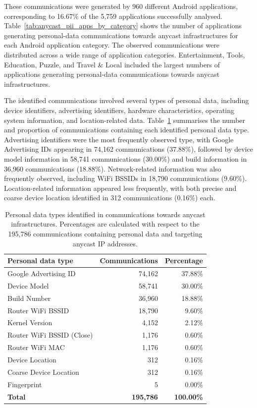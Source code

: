 These communications were generated by 960 different Android applications, corresponding to 16.67\% of the 5,759 applications successfully analysed. Table~\ref{tab:anycast_pii_apps_by_category} shows the number of applications generating personal-data communications towards anycast infrastructures for each Android application category. The observed communications were distributed across a wide range of application categories. Entertainment, Tools, Education, Puzzle, and Travel \& Local included the largest numbers of applications generating personal-data communications towards anycast infrastructures.

The identified communications involved several types of personal data, including device identifiers, advertising identifiers, hardware characteristics, operating system information, and location-related data. Table~\ref{tab:anycast_pii_communications_type} summarises the number and proportion of communications containing each identified personal data type. Advertising identifiers were the most frequently observed type, with Google Advertising IDs appearing in 74,162 communications (37.88\%), followed by device model information in 58,741 communications (30.00\%) and build information in 36,960 communications (18.88\%). Network-related information was also frequently observed, including WiFi BSSIDs in 18,790 communications (9.60\%). Location-related information appeared less frequently, with both precise and coarse device location identified in 312 communications (0.16\%) each.

\begin{table}[ht]
    \centering
    \small
    \caption{Personal data types identified in communications towards anycast infrastructures. Percentages are calculated with respect to the 195,786 communications containing personal data and targeting anycast IP addresses.}
    \label{tab:anycast_pii_communications_type}
    \begin{tabular}{lrr}
        \toprule
        \textbf{Personal data type} & \textbf{Communications} & \textbf{Percentage} \\
        \midrule
        Google Advertising ID & 74,162 & 37.88\% \\
        Device Model & 58,741 & 30.00\% \\
        Build Number & 36,960 & 18.88\% \\
        Router WiFi BSSID & 18,790 & 9.60\% \\
        Kernel Version & 4,152 & 2.12\% \\
        Router WiFi BSSID (Close) & 1,176 & 0.60\% \\
        Router WiFi MAC & 1,176 & 0.60\% \\
        Device Location & 312 & 0.16\% \\
        Coarse Device Location & 312 & 0.16\% \\
        Fingerprint & 5 & 0.00\% \\
        \midrule
        \textbf{Total} & \textbf{195,786} & \textbf{100.00\%} \\
        \bottomrule
    \end{tabular}
\end{table}

